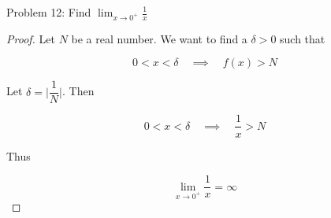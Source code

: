 \usepackage{amsthm}

Problem 12: Find $\lim_{x \rightarrow 0^+} \frac{1}{x}$

\begin{proof}
Let $N$ be a real number. We want to find a $\delta > 0$ such that

$$ 0 < x < \delta \quad \implies \quad f(x) > N $$

Let $\delta = \Big|\dfrac{1}{N}\Big|$. Then

$$ 0 < x < \delta \quad \implies \quad \frac{1}{x} > N$$

Thus 

$$ \lim_{x \rightarrow 0^+} \frac{1}{x} = \infty $$
\end{proof}
